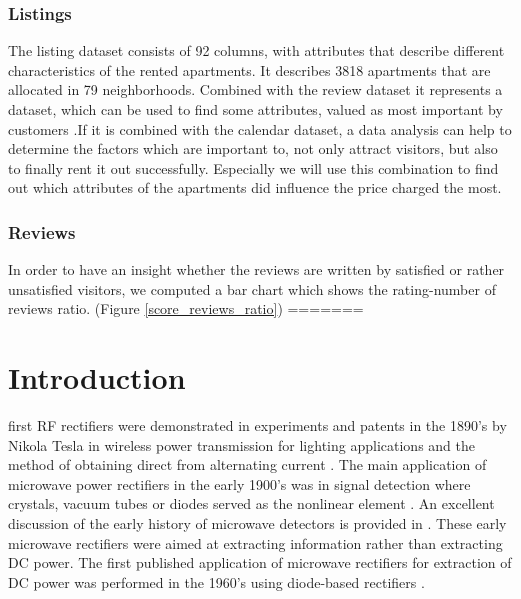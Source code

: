 \documentclass[journal]{IEEEtran}
\begin{document}
\subsubsection{Listings}
The listing dataset consists of 92 columns, with attributes that describe different characteristics of the rented apartments. It describes 3818 apartments that are allocated in 79 neighborhoods. Combined with the review dataset it represents a dataset, which can be used to find some attributes, valued as most important by customers\cite{RN1} .If it is combined with the calendar dataset, a data analysis can help to determine the factors which are important to, not only attract visitors, but also to finally rent it out successfully. Especially we will use this combination to find out which attributes of the apartments did influence the price charged the most.
\subsubsection{Reviews}
In order to have an insight whether the reviews are written by satisfied or rather unsatisfied visitors, we computed a bar chart which shows the rating-number of reviews ratio. (Figure \ref{score_reviews_ratio})
=======
\section{Introduction}

 first RF rectifiers were demonstrated in experiments and patents in the 1890's by Nikola Tesla in wireless power transmission for lighting applications and the method of obtaining direct from alternating current \cite{tesla}. The main application of microwave power rectifiers in the early 1900's was in signal detection where crystals, vacuum tubes or diodes served as the nonlinear element \cite{early_rect1,early_rect2}.  An excellent discussion of the early history of microwave detectors is provided in \cite{converter_history}.  These early microwave rectifiers were aimed at extracting information rather than extracting DC power.  The first published application of microwave rectifiers for extraction of DC power was performed in the 1960's using diode-based rectifiers  \cite{purdue_rect,brown_rect1,brown_rect2,nasa_report1}.
\end{document}
